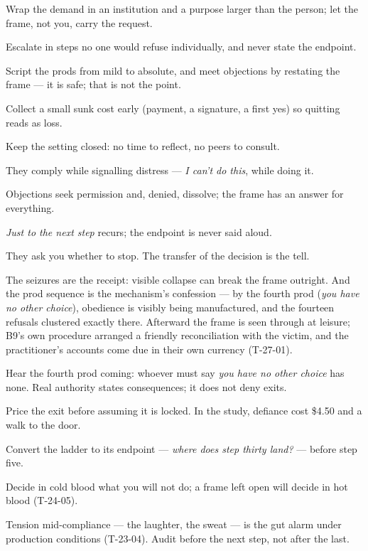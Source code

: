 \begin{application}
  \item Wrap the demand in an institution and a purpose larger than the person; let the frame, not you, carry the request.
  \item Escalate in steps no one would refuse individually, and never state the endpoint.
  \item Script the prods from mild to absolute, and meet objections by restating the frame --- it is safe; that is not the point.
  \item Collect a small sunk cost early (payment, a signature, a first yes) so quitting reads as loss.
  \item Keep the setting closed: no time to reflect, no peers to consult.
\end{application}
\begin{feedback}
  \item They comply while signalling distress --- \emph{I can't do this}, while doing it.
  \item Objections seek permission and, denied, dissolve; the frame has an answer for everything.
  \item \emph{Just to the next step} recurs; the endpoint is never said aloud.
  \item They ask you whether to stop. The transfer of the decision is the tell.
\end{feedback}
\begin{failure}
The seizures are the receipt: visible collapse can break the frame outright. And the prod sequence is the mechanism's confession --- by the fourth prod (\emph{you have no other choice}), obedience is visibly being manufactured, and the fourteen refusals clustered exactly there. Afterward the frame is seen through at leisure; B9's own procedure arranged a friendly reconciliation with the victim, and the practitioner's accounts come due in their own currency (T-27-01).
\end{failure}
\begin{countermeasures}
  \item Hear the fourth prod coming: whoever must say \emph{you have no other choice} has none. Real authority states consequences; it does not deny exits.
  \item Price the exit before assuming it is locked. In the study, defiance cost \$4.50 and a walk to the door.
  \item Convert the ladder to its endpoint --- \emph{where does step thirty land?} --- before step five.
  \item Decide in cold blood what you will not do; a frame left open will decide in hot blood (T-24-05).
  \item Tension mid-compliance --- the laughter, the sweat --- is the gut alarm under production conditions (T-23-04). Audit before the next step, not after the last.
\end{countermeasures}

\seesources
{}
